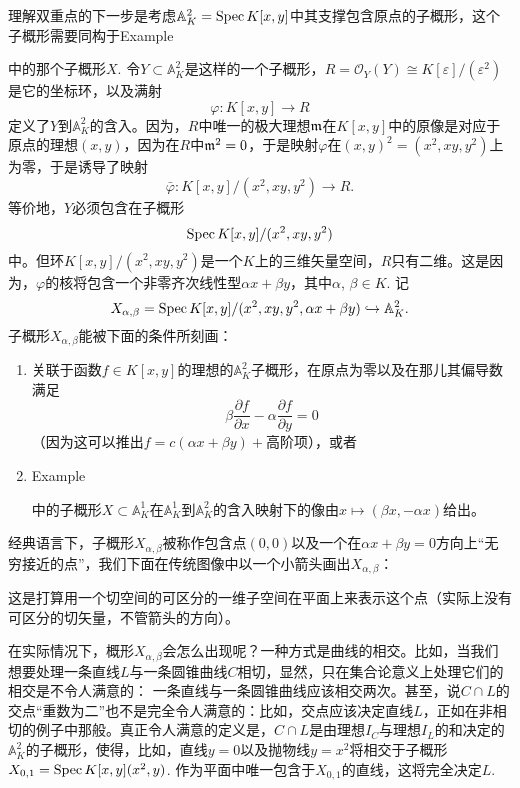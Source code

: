 \begin{exa}[双重点]
理解双重点的下一步是考虑$\mathbb{A}_K^2=\operatorname{Spec} K[x,y]$中其支撑包含原点的子概形，这个子概形需要同构于Example {{\addtocounter{thm}{-1}}\thethm{\addtocounter{thm}{1}}}中的那个子概形$X$. 令$Y\subset \mathbb{A}_K^2$是这样的一个子概形，$R=\mathscr{O}_Y(Y)\cong K[\varepsilon]/(\varepsilon^2)$是它的坐标环，以及满射
\[
	\varphi:K[x,y]\to R
\]
定义了$Y$到$\mathbb{A}_K^2$的含入。因为，$R$中唯一的极大理想$\mathfrak{m}$在$K[x,y]$中的原像是对应于原点的理想$(x,y)$，因为在$R$中$\mathfrak{m}^2=0$，于是映射$\varphi$在$(x,y)^2=(x^2,xy,y^2)$上为零，于是诱导了映射
\[
	\bar\varphi:K[x,y]/(x^2,xy,y^2)\to R.
\]
等价地，$Y$必须包含在子概形
\[
	\operatorname{Spec} K[x,y]/(x^2,xy,y^2)
\]
中。但环$K[x,y]/(x^2,xy,y^2)$是一个$K$上的三维矢量空间，$R$只有二维。这是因为，$\varphi$的核将包含一个非零齐次线性型$\alpha x+\beta y$，其中$\alpha$, $\beta\in K$. 记
\[
	X_{\alpha,\beta}=\operatorname{Spec} K[x,y]/(x^2,xy,y^2,\alpha x+\beta y)\hookrightarrow \mathbb{A}_K^2.
\]
子概形$X_{\alpha,\beta}$能被下面的条件所刻画：

\begin{enumerate}[{(i)}]\setlength{\itemsep}{0pt}
\item 关联于函数$f\in K[x,y]$的理想的$\mathbb{A}^2_K$子概形，在原点为零以及在那儿其偏导数满足
\[
	\beta\frac{\partial f}{\partial x}-\alpha\frac{\partial f}{\partial y}=0
\]
（因为这可以推出$f=c(\alpha x+\beta y)+$高阶项），或者
\item Example {{\addtocounter{thm}{-1}}\thethm{\addtocounter{thm}{1}}}中的子概形$X\subset \mathbb{A}_K^1$在$\mathbb{A}_K^1$到$\mathbb{A}_K^2$的含入映射下的像由$x\mapsto (\beta x,-\alpha x)$给出。
\end{enumerate}

经典语言下，子概形$X_{\alpha,\beta}$被称作包含点$(0,0)$以及一个在$\alpha x+\beta y=0$方向上“无穷接近的点”，我们下面在传统图像中以一个小箭头画出$X_{\alpha,\beta}$：


\noindent 这是打算用一个切空间的可区分的一维子空间在平面上来表示这个点（实际上没有可区分的切矢量，不管箭头的方向）。\nottran
\end{exa}

在实际情况下，概形$X_{\alpha,\beta}$会怎么出现呢？一种方式是曲线的相交。比如，当我们想要处理一条直线$L$与一条圆锥曲线$C$相切，显然，只在集合论意义上处理它们的相交是不令人满意的：
一条直线与一条圆锥曲线应该相交两次。甚至，说$C\cap L$的交点“重数为二”也不是完全令人满意的：比如，交点应该决定直线$L$，正如在非相切的例子中那般。真正令人满意的定义是，$C\cap L$是由理想$I_C$与理想$I_L$的和决定的$\mathbb{A}_K^2$的子概形，使得，比如，直线$y=0$以及抛物线$y=x^2$将相交于子概形$X_{0,1}=\operatorname{Spec} K[x,y](x^2,y)$. 作为平面中唯一包含于$X_{0,1}$的直线，这将完全决定$L$. 


